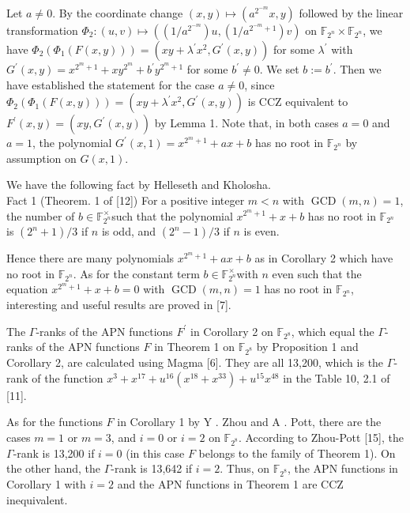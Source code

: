 \documentclass[10pt]{article}
\begin{document}
Let $a \neq 0$. By the coordinate change $(x, y) \mapsto\left(a^{2^{-m}} x, y\right)$ followed by the linear transformation $\Phi_{2}:(u, v) \mapsto\left(\left(1 / a^{2^{-m}}\right) u,\left(1 / a^{2^{-m}+1}\right) v\right)$ on $\mathbb{F}_{2^{n}} \times \mathbb{F}_{2^{n}}$, we have $\Phi_{2}\left(\Phi_{1}(F(x, y))\right)= \left(x y+\lambda^{\prime} x^{2}, G^{\prime}(x, y)\right)$ for some $\lambda^{\prime}$ with $G^{\prime}(x, y)=x^{2^{m}+1}+x y^{2^{m}}+b^{\prime} y^{2^{m}+1}$ for some $b^{\prime} \neq 0$. We set $b:=b^{\prime}$. Then we have established the statement for the case $a \neq 0$, since $\Phi_{2}\left(\Phi_{1}(F(x, y))\right)=\left(x y+\lambda^{\prime} x^{2}, G^{\prime}(x, y)\right)$ is CCZ equivalent to $F^{\prime}(x, y)=\left(x y, G^{\prime}(x, y)\right)$ by Lemma 1. Note that, in both cases $a=0$ and $a=1$, the polynomial $G^{\prime}(x, 1)=x^{2^{m}+1}+a x+b$ has no root in $\mathbb{F}_{2^{n}}$ by assumption on $G(x, 1)$.

We have the following fact by Helleseth and Kholosha.\\[0pt]
Fact 1 (Theorem. 1 of [12]) For a positive integer $m<n$ with $\operatorname{GCD}(m, n)=1$, the number of $b \in \mathbb{F}_{2^{n}}^{\times}$such that the polynomial $x^{2^{m}+1}+x+b$ has no root in $\mathbb{F}_{2^{n}}$ is $\left(2^{n}+1\right) / 3$ if $n$ is odd, and $\left(2^{n}-1\right) / 3$ if $n$ is even.

Hence there are many polynomials $x^{2^{m}+1}+a x+b$ as in Corollary 2 which have no root in $\mathbb{F}_{2^{n}}$. As for the constant term $b \in \mathbb{F}_{2^{n}}^{\times}$with $n$ even such that the equation $x^{2^{m}+1}+x+b=0$ with $\operatorname{GCD}(m, n)=1$ has no root in $\mathbb{F}_{2^{n}}$, interesting and useful results are proved in [7].

The $\Gamma$-ranks of the APN functions $F^{\prime}$ in Corollary 2 on $\mathbb{F}_{2^{8}}$, which equal the $\Gamma$-ranks of the APN functions $F$ in Theorem 1 on $\mathbb{F}_{2^{8}}$ by Proposition 1 and Corollary 2, are calculated using Magma [6]. They are all 13,200, which is the $\Gamma$-rank of the function $x^{3}+x^{17}+ u^{16}\left(x^{18}+x^{33}\right)+u^{15} x^{48}$ in the Table 10, 2.1 of [11].

As for the functions $F$ in Corollary 1 by Y . Zhou and A . Pott, there are the cases $m=1$ or $m=3$, and $i=0$ or $i=2$ on $\mathbb{F}_{2^{8}}$. According to Zhou-Pott [15], the $\Gamma$-rank is 13,200 if $i=0$ (in this case $F$ belongs to the family of Theorem 1). On the other hand, the $\Gamma$-rank is 13,642 if $i=2$. Thus, on $\mathbb{F}_{2^{8}}$, the APN functions in Corollary 1 with $i=2$ and the APN functions in Theorem 1 are CCZ inequivalent.
\end{document}
